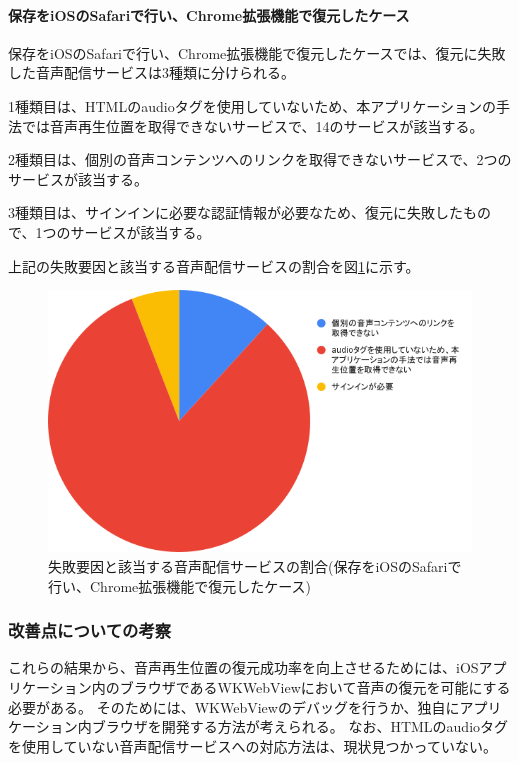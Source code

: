 \paragraph{保存をiOSのSafariで行い、Chrome拡張機能で復元したケース}
保存をiOSのSafariで行い、Chrome拡張機能で復元したケースでは、復元に失敗した音声配信サービスは3種類に分けられる。

1種類目は、HTMLのaudioタグを使用していないため、本アプリケーションの手法では音声再生位置を取得できないサービスで、14のサービスが該当する。

2種類目は、個別の音声コンテンツへのリンクを取得できないサービスで、2つのサービスが該当する。

3種類目は、サインインに必要な認証情報が必要なため、復元に失敗したもので、1つのサービスが該当する。

上記の失敗要因と該当する音声配信サービスの割合を図\ref{fig:evl-consideration-audio-cause-ratio-ios-chrome}に示す。

\begin{figure}[htbp]
  \label{fig:evl-consideration-audio-cause-ratio-ios-chrome}
  \begin{center}
    \includegraphics[bb=0 0 600 371,width=15cm]{img/060_evaluation/consideration/audio/cause-ratio-ios-chrome.pdf}
  \end{center}
  \caption{失敗要因と該当する音声配信サービスの割合(保存をiOSのSafariで行い、Chrome拡張機能で復元したケース)}
\end{figure}

\subsubsection{改善点についての考察}
これらの結果から、音声再生位置の復元成功率を向上させるためには、iOSアプリケーション内のブラウザであるWKWebViewにおいて音声の復元を可能にする必要がある。
そのためには、WKWebViewのデバッグを行うか、独自にアプリケーション内ブラウザを開発する方法が考えられる。
なお、HTMLのaudioタグを使用していない音声配信サービスへの対応方法は、現状見つかっていない。